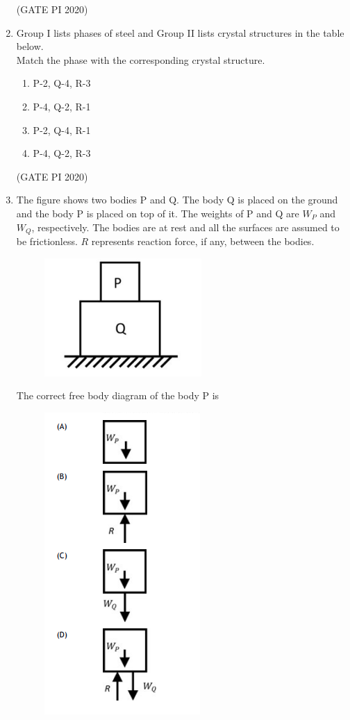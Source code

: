 \documentclass[journal,12pt,onecolumn]{IEEEtran}
\theoremstyle{remark}
\begin{document}
\begin{enumerate}
\hfill (GATE PI 2020)

\item Group I lists phases of steel and Group II lists crystal structures in the table below. \\




Match the phase with the corresponding crystal structure.
\begin{enumerate}
    \item P-2, Q-4, R-3
    \item P-4, Q-2, R-1
    \item P-2, Q-4, R-1
    \item P-4, Q-2, R-3
\end{enumerate}

\hfill (GATE PI 2020)

\item The figure shows two bodies P and Q. The body Q is placed on the ground and the body P is placed on top of it. The weights of P and Q are $W_P$ and $W_Q$, respectively. The bodies are at rest and all the surfaces are assumed to be frictionless. $R$ represents reaction force, if any, between the bodies.
\newpage
\begin{figure}[h]
    \centering
    \includegraphics[width=0.5\columnwidth]{figs/fig5.png}
    \caption{}
    \label{fig:placeholder}
\end{figure}


The correct free body diagram of the body P is
\begin{figure}[h]
    \includegraphics[width=0.4\columnwidth]{figs/fig6.png}
    \caption{}
    \label{fig:placeholder}
\end{figure}


\end{enumerate}
\end{document}

